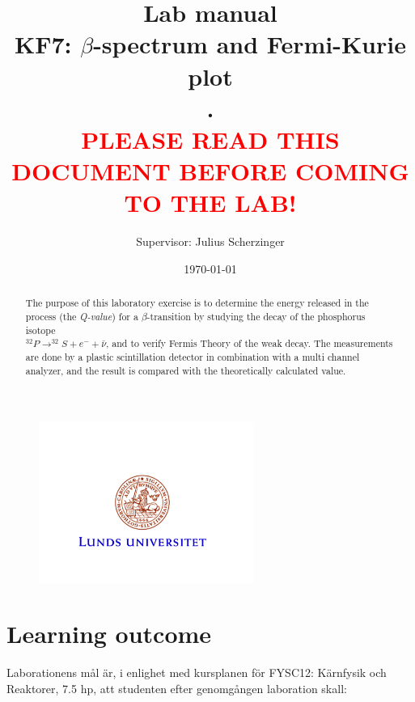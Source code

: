 \documentclass[a4,11pt, notitlepage]{article}
\begin{document}
 
\title{\huge{Lab manual
\\KF7: $\beta$-spectrum and Fermi-Kurie plot
\\.
\\\textcolor{red}{PLEASE READ THIS DOCUMENT BEFORE COMING TO THE LAB!}}}
\author{Supervisor: Julius Scherzinger}
\date{\today}
\maketitle

\vspace{10pt}
\begin{abstract}
The purpose of this laboratory exercise is to determine the energy released in the process (the \textit{Q-value}) for a $\beta$-transition by studying the decay of the phosphorus isotope 
\\$^{32}P\rightarrow ^{32}S + e^- + \bar{\nu}$, and to verify Fermis Theory of the weak decay. The measurements are done by a plastic scintillation detector in combination with a multi channel analyzer, and the result is compared with the theoretically calculated value. 
\end{abstract}

\begin{figure}[htp]
  \vspace{40pt}
  \begin{center}
    \includegraphics[width=7.0cm]{figures/LU.png}
  \end{center}
\end{figure}

\thispagestyle{empty}

\pagebreak
\tableofcontents 
\pagebreak
\section{Learning outcome}

Laborationens mål är, i enlighet med kursplanen för FYSC12: Kärnfysik och Reaktorer, 7.5 hp, att studenten efter genomgången laboration skall:
\end{document}
